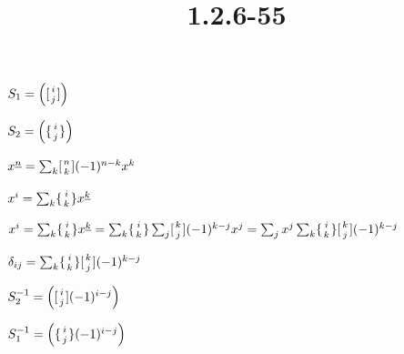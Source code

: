 \documentclass{article}
\title{1.2.6-55}
\begin{document}
\maketitle

\( S_1 = \left([{i \atop j}]\right) \)

\( S_2 = \left(\{{i \atop j}\}\right) \)

\( x^{\underline{n}} = \sum_k [{n \atop k}](-1)^{n-k}x^k \)

\( x^{i} = \sum_k \{{i \atop k}\}x^{\underline{k}} \)

\( x^{i} = \sum_k \{{i \atop k}\}x^{\underline{k}} = \sum_k \{{i \atop k}\}\sum_j [{k \atop j}](-1)^{k-j}x^j = \sum_j x^j \sum_k \{{i \atop k}\}[{k \atop j}](-1)^{k-j} \)

\( \delta_{ij} = \sum_k \{{i \atop k}\}[{k \atop j}](-1)^{k-j} \)

\( S_2^{-1} = \left([{i \atop j}](-1)^{i-j}\right) \)

\( S_1^{-1} = \left(\{{i \atop j}\}(-1)^{i-j}\right) \)
\end{document}
